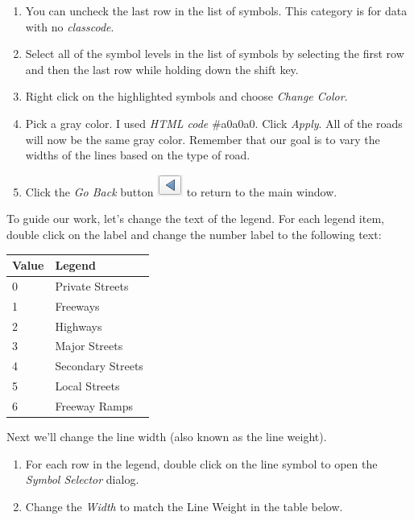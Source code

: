 \documentclass[
]{article}
\providecommand{\tightlist}{%
  \setlength{\itemsep}{0pt}\setlength{\parskip}{0pt}}
\begin{document}
\begin{enumerate}
\def\labelenumi{\arabic{enumi}.}
\tightlist
\item
  You can uncheck the last row in the list of symbols. This category is for data with no \emph{classcode}.
\item
  Select all of the symbol levels in the list of symbols by selecting the first row and then the last row while holding down the shift key.
\item
  Right click on the highlighted symbols and choose \emph{Change Color}.
\item
  Pick a gray color. I used \emph{HTML code} \#a0a0a0. Click \emph{Apply}. All of the roads will now be the same gray color. Remember that our goal is to vary the widths of the lines based on the type of road.
\item
  Click the \emph{Go Back} button \includegraphics{./images/Tool_GoBack.PNG} to return to the main window.
\end{enumerate}

To guide our work, let's change the text of the legend. For each legend item, double click on the label and change the number label to the following text:

\begin{longtable}[]{@{}ll@{}}
\toprule()
Value & Legend \\
\midrule()
\endhead
0 & Private Streets \\
1 & Freeways \\
2 & Highways \\
3 & Major Streets \\
4 & Secondary Streets \\
5 & Local Streets \\
6 & Freeway Ramps \\
\bottomrule()
\end{longtable}

Next we'll change the line width (also known as the line weight).

\begin{enumerate}
\def\labelenumi{\arabic{enumi}.}
\tightlist
\item
  For each row in the legend, double click on the line symbol to open the \emph{Symbol Selector} dialog.
\item
  Change the \emph{Width} to match the Line Weight in the table below.
\end{enumerate}
\end{document}
